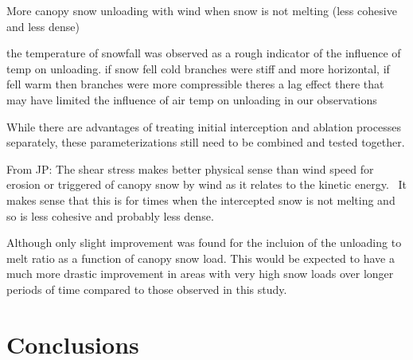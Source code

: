 \documentclass[
  letterpaper,
  DIV=11,
  numbers=noendperiod]{scrartcl}
\begin{document}
More canopy snow unloading with wind when snow is not melting (less
cohesive and less dense)

the temperature of snowfall was observed as a rough indicator of the
influence of temp on unloading. if snow fell cold branches were stiff
and more horizontal, if fell warm then branches were more compressible
theres a lag effect there that may have limited the influence of air
temp on unloading in our observations

While there are advantages of treating initial interception and ablation
processes separately, these parameterizations still need to be combined
and tested together.

From JP: The shear stress makes better physical sense than wind speed
for erosion or triggered of canopy snow by wind as it relates to the
kinetic energy.~ It makes sense that this is for times when the
intercepted snow is not melting and so is less cohesive and probably
less dense.

Although only slight improvement was found for the incluion of the
unloading to melt ratio as a function of canopy snow load. This would be
expected to have a much more drastic improvement in areas with very high
snow loads over longer periods of time compared to those observed in
this study.

\section{Conclusions}\label{conclusions}
\end{document}
